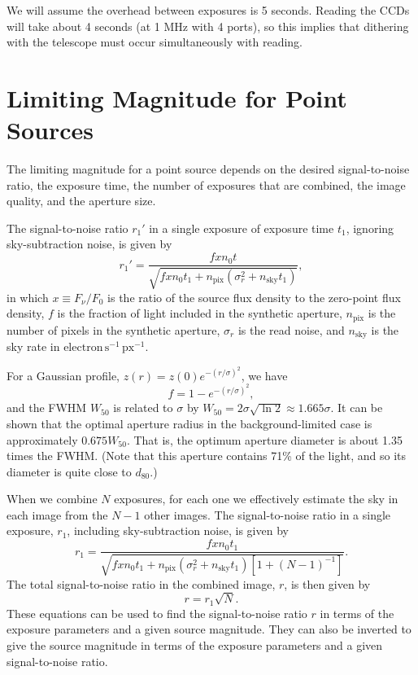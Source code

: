 \documentclass{article}
\begin{document}
We will assume the overhead between exposures is 5 seconds. Reading the CCDs will take about 4 seconds (at 1 MHz with 4 ports), so this implies that dithering with the telescope must occur simultaneously with reading.

\section{Limiting Magnitude for Point Sources}

The limiting magnitude for a point source depends on the desired signal-to-noise ratio, the exposure time, the number of exposures that are combined, the image quality, and the aperture size.

The signal-to-noise ratio $r_1'$ in a single exposure of exposure time $t_1$, ignoring sky-subtraction noise, is given by
\begin{equation}
r_1' = \frac{f x n_0 t}{\sqrt{f x n_0 t_1 + n_\mathrm{pix}\left(\sigma_r^2 + n_\mathrm{sky}t_1\right)}},
\end{equation}
in which $x \equiv F_\nu/F_0$ is the ratio of the source flux density to the zero-point flux density, $f$ is the fraction of light included in the synthetic aperture, $n_\mathrm{pix}$ is the number of pixels in the synthetic aperture, $\sigma_r$ is the read noise, and $n_\mathrm{sky}$ is the sky rate in $\mathrm{electron\,s^{-1}\,px^{-1}}$.

For a Gaussian profile, $z(r) = z(0) e^{-(r/\sigma)^2}$, we have
\begin{equation}
f = 1-e^{-(r/\sigma)^2},
\end{equation}
and the FWHM $W_{50}$ is related to $\sigma$ by $W_{50} = 2\sigma\sqrt{\ln2} \approx 1.665 \sigma$. It can be shown that the optimal aperture radius in the background-limited case is approximately $0.675 W_{50}$. That is, the optimum aperture diameter is about 1.35 times the FWHM. (Note that this aperture contains 71\% of the light, and so its diameter is quite close to $d_{80}$.)

When we combine $N$ exposures, for each one we effectively estimate the sky in each image from the $N-1$ other images. The signal-to-noise ratio in a single exposure, $r_1$, including sky-subtraction noise, is given by
\begin{equation}
r_1 = \frac{fx n_0 t_1}{\sqrt{fx n_0 t_1 + n_\mathrm{pix}\left(\sigma_r^2 + n_\mathrm{sky} t_1\right)\left[1+(N-1)^{-1}\right]}}.
\end{equation}
The total signal-to-noise ratio in the combined image, $r$, is then given by
\begin{equation}
r = r_1 \sqrt{N}.
\end{equation}
These equations can be used to find the signal-to-noise ratio $r$ in terms of the exposure parameters and a given source magnitude. They can also be inverted to give the source magnitude in terms of the exposure parameters and a given signal-to-noise ratio. 
\end{document}
